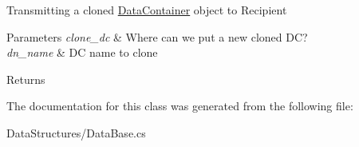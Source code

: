 Transmitting a cloned \hyperlink{class_dwarf_d_b_1_1_data_structures_1_1_data_container}{Data\+Container} object to Recipient 


\begin{DoxyParams}{Parameters}
{\em clone\+\_\+dc} & Where can we put a new cloned D\+C?\\
\hline
{\em dn\+\_\+name} & D\+C name to clone\\
\hline
\end{DoxyParams}
\begin{DoxyReturn}{Returns}

\end{DoxyReturn}


The documentation for this class was generated from the following file\+:\begin{DoxyCompactItemize}
\item 
Data\+Structures/Data\+Base.\+cs\end{DoxyCompactItemize}
